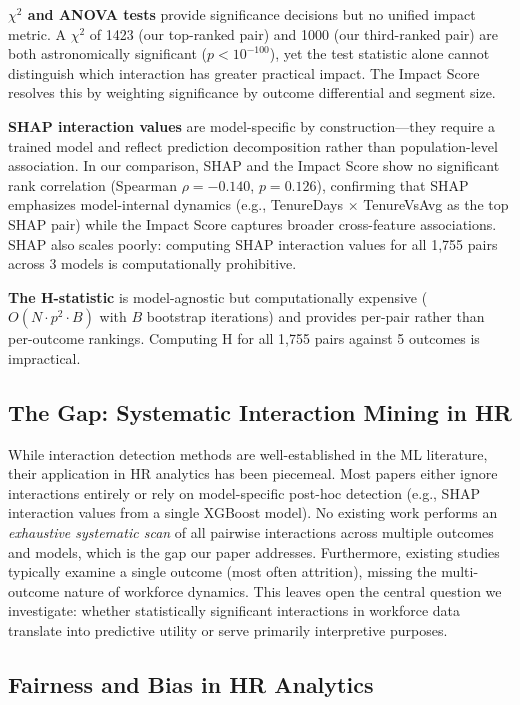 \documentclass[conference]{IEEEtran}
\begin{document}
\textbf{$\chi^2$ and ANOVA tests} provide significance decisions but no unified impact metric. A $\chi^2$ of 1423 (our top-ranked pair) and 1000 (our third-ranked pair) are both astronomically significant ($p<10^{-100}$), yet the test statistic alone cannot distinguish which interaction has greater practical impact. The Impact Score resolves this by weighting significance by outcome differential and segment size.

\textbf{SHAP interaction values} are model-specific by construction---they require a trained model and reflect prediction decomposition rather than population-level association. In our comparison, SHAP and the Impact Score show no significant rank correlation (Spearman $\rho=-0.140$, $p=0.126$), confirming that SHAP emphasizes model-internal dynamics (e.g., TenureDays $\times$ TenureVsAvg as the top SHAP pair) while the Impact Score captures broader cross-feature associations. SHAP also scales poorly: computing SHAP interaction values for all 1,755 pairs across 3 models is computationally prohibitive.

\textbf{The H-statistic} is model-agnostic but computationally expensive ($O(N\cdot p^2\cdot B)$ with $B$ bootstrap iterations) and provides per-pair rather than per-outcome rankings. Computing H for all 1,755 pairs against 5 outcomes is impractical.

\subsection{The Gap: Systematic Interaction Mining in HR}

While interaction detection methods are well-established in the ML literature, their application in HR analytics has been piecemeal. Most papers either ignore interactions entirely or rely on model-specific post-hoc detection (e.g., SHAP interaction values from a single XGBoost model). No existing work performs an \textit{exhaustive systematic scan} of all pairwise interactions across multiple outcomes and models, which is the gap our paper addresses. Furthermore, existing studies typically examine a single outcome (most often attrition), missing the multi-outcome nature of workforce dynamics. This leaves open the central question we investigate: whether statistically significant interactions in workforce data translate into predictive utility or serve primarily interpretive purposes.

\subsection{Fairness and Bias in HR Analytics}
\end{document}
